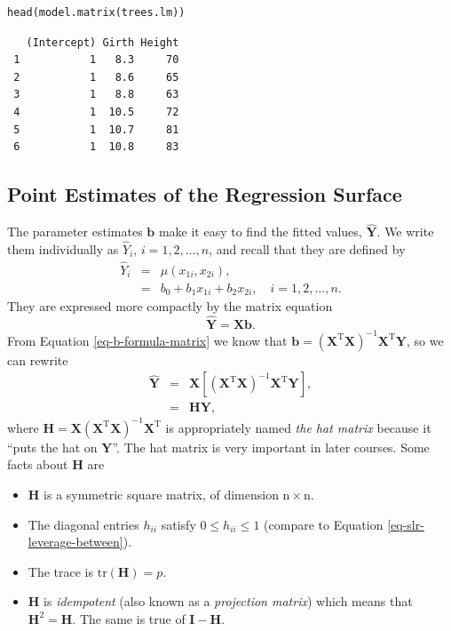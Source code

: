 \documentclass[captions=tableheading]{scrbook}
\begin{document}
\begin{verbatim}
head(model.matrix(trees.lm))
\end{verbatim}

\begin{verbatim}
   (Intercept) Girth Height
 1           1   8.3     70
 2           1   8.6     65
 3           1   8.8     63
 4           1  10.5     72
 5           1  10.7     81
 6           1  10.8     83
\end{verbatim}
\subsection{Point Estimates of the Regression Surface}
\label{sec-12-2-2}
\label{sub-mlr-point-est-regsurface}


The parameter estimates \(\mathbf{b}\) make it easy to find the fitted values, \(\hat{\mathbf{Y}}\). We write them individually as \(\hat{Y}_{i}\), \(i=1,2,\ldots,n\), and recall that they are defined by
\begin{eqnarray}
\hat{Y}_{i} & = & \hat{\mu}(x_{1i},x_{2i}),\\
 & = & b_{0}+b_{1}x_{1i}+b_{2}x_{2i},\quad i=1,2,\ldots,n.
\end{eqnarray}
They are expressed more compactly by the matrix equation
\begin{equation}
\hat{\mathbf{Y}}=\mathbf{X}\mathbf{b}.
\end{equation}
From Equation \ref{eq-b-formula-matrix} we know that \(\mathbf{b}=\left(\mathbf{X}^{\mathrm{T}}\mathbf{X}\right)^{-1}\mathbf{X}^{\mathrm{T}}\mathbf{Y}\), so we can rewrite
\begin{eqnarray}
\hat{\mathbf{Y}} & = & \mathbf{X}\left[\left(\mathbf{X}^{\mathrm{T}}\mathbf{X}\right)^{-1}\mathbf{X}^{\mathrm{T}}\mathbf{Y}\right],\\
 & = & \mathbf{H}\mathbf{Y},
\end{eqnarray}
where \(\mathbf{H}=\mathbf{X}\left(\mathbf{X}^{\mathrm{T}}\mathbf{X}\right)^{-1}\mathbf{X}^{\mathrm{T}}\) is appropriately named \emph{the hat matrix} because it ``puts the hat on \(\mathbf{Y}\)''. The hat matrix is very important in later courses. Some facts about \(\mathbf{H}\) are
\begin{itemize}
\item \(\mathbf{H}\) is a symmetric square matrix, of dimension \(\mathrm{n}\times\mathrm{n}\).
\item The diagonal entries \(h_{ii}\) satisfy \(0\leq h_{ii}\leq1\) (compare to Equation \ref{eq-slr-leverage-between}).
\item The trace is \(\mathrm{tr}(\mathbf{H})=p\).
\item \(\mathbf{H}\) is \emph{idempotent} (also known as a \emph{projection matrix}) which means that \(\mathbf{H}^{2}=\mathbf{H}\). The same is true of \(\mathbf{I}-\mathbf{H}\).
\end{itemize}
\end{document}
